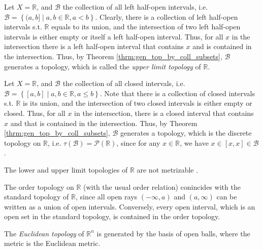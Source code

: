 \begin{defn}
	Let $X = \mathbb R$, and $\mathscr B$ the collection of all left half-open intervals, i.e. $\mathscr B= \left\{ (a, b] \mid a, b\in\mathbb R, a < b \right\}$. Clearly, there is a collection of left half-open intervals s.t. $\mathbb R$ equals to its union, and the intersection of two left half-open intervals is either empty or itself a left half-open interval. Thus, for all $x$ in the intersection there is a left half-open interval that contains $x$ and is contained in the intersection. Thus, by Theorem \ref{thrm:gen_top_by_coll_subsets}, $\mathscr B$ generates a topology, which is called the \textit{upper limit topology} of $\mathbb R$.
\end{defn}

\begin{remark}
	Let $X = \mathbb R$, and $\mathscr B$ the collection of all closed intervals, i.e. $\mathscr B = \left\{ [a, b]\mid a, b\in\mathbb R, a \leq b \right\}$. Note that there is a collection of closed intervals s.t. $\mathbb R$ is its union, and the intersection of two closed intervals is either empty or closed. Thus, for all $x$ in the intersection, there is a closed interval that contains $x$ and that is contained in the intersection. Thus, by Theorem \ref{thrm:gen_top_by_coll_subsets}, $\mathscr B$ generates a topology, which is the discrete topology on $\mathbb R$, i.e. $\tau(\mathscr B) = \mathscr P(\mathbb R)$, since for any $x\in \mathbb R$, we have $x\in [x, x]\in \mathscr B$.
\end{remark}

\begin{remark}
	The lower and upper limit topologies of $\mathbb R$ are not metrizable \cite{790629}.
\end{remark}

\begin{exmp}
	The order topology on $\mathbb R$ (with the usual order relation) conincides with the standard topology of $\mathbb R$, since all open rays $(-\infty, a)$ and $(a, \infty)$ can be written as a union of open intervals. Conversely, every open interval, which is an open set in the standard topology, is contained in the order topology.
\end{exmp}

\begin{defn}\label{defn:euclidean_topology}
	The \textit{Euclidean topology} of $\mathbb R^n$ is generated by the basis of open balls, where the metric is the Euclidean metric.
\end{defn}	

